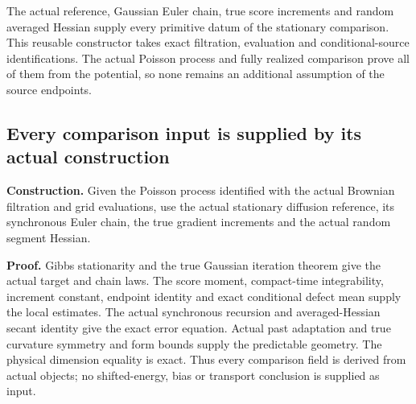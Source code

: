 \documentclass[11pt,a4paper]{report}
\begin{document}
The actual reference, Gaussian Euler chain, true score increments and random averaged Hessian supply every primitive datum of the stationary comparison. This reusable constructor takes exact filtration, evaluation and conditional-source identifications. The actual Poisson process and fully realized comparison prove all of them from the potential, so none remains an additional assumption of the source endpoints.

\subsection{\texorpdfstring{Every comparison input is supplied by its actual construction}{Every comparison input is supplied by its actual construction}}
\label{report-step-WassersteinMixing-ConcreteComparison-lean-1}


\textbf{Construction.} Given the Poisson process identified with the actual Brownian filtration and grid evaluations, use the actual stationary diffusion reference, its synchronous Euler chain, the true gradient increments and the actual random segment Hessian.



\textbf{Proof.} Gibbs stationarity and the true Gaussian iteration theorem give the actual target and chain laws. The score moment, compact-time integrability, increment constant, endpoint identity and exact conditional defect mean supply the local estimates. The actual synchronous recursion and averaged-Hessian secant identity give the exact error equation. Actual past adaptation and true curvature symmetry and form bounds supply the predictable geometry. The physical dimension equality is exact. Thus every comparison field is derived from actual objects; no shifted-energy, bias or transport conclusion is supplied as input.
\end{document}
